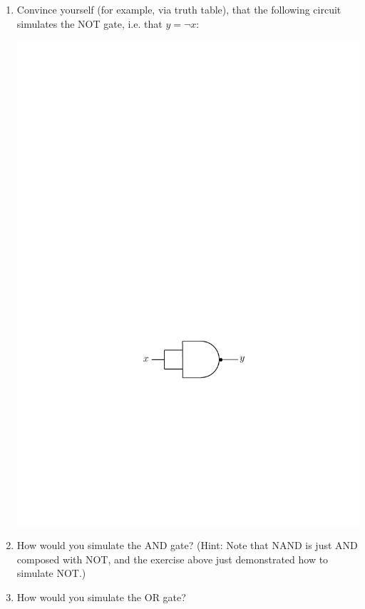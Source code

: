 \documentclass[11pt]{article}
\begin{document}
\begin{enumerate}
\begin{enumerate}
    \item Convince yourself (for example, via truth table), that the following circuit simulates the NOT gate, i.e. that $y=\neg x$:
\begin{center}
\includegraphics[scale = 0.7]{NOT.pdf}
\end{center}
    \item How would you simulate the AND gate? (Hint: Note that NAND is just AND composed with NOT, and the exercise above just demonstrated how to simulate NOT.)
    \item How would you simulate the OR gate?
\end{enumerate}


\end{enumerate}
\end{document}
